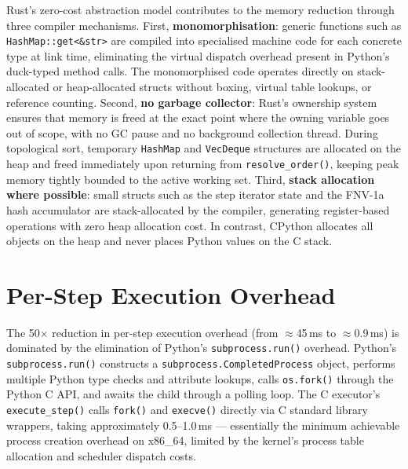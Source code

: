 \documentclass[12pt,a4paper]{report}
\begin{document}
Rust's zero-cost abstraction model contributes to the memory reduction through
three compiler mechanisms. First, \textbf{monomorphisation}: generic functions
such as \texttt{HashMap::get<\&str>} are compiled into specialised machine code
for each concrete type at link time, eliminating the virtual dispatch overhead
present in Python's duck-typed method calls. The monomorphised code operates
directly on stack-allocated or heap-allocated structs without boxing, virtual table
lookups, or reference counting. Second, \textbf{no garbage collector}: Rust's
ownership system ensures that memory is freed at the exact point where the owning
variable goes out of scope, with no GC pause and no background collection thread.
During topological sort, temporary \texttt{HashMap} and \texttt{VecDeque}
structures are allocated on the heap and freed immediately upon returning from
\texttt{resolve\_order()}, keeping peak memory tightly bounded to the active
working set. Third, \textbf{stack allocation where possible}: small structs such
as the step iterator state and the FNV-1a hash accumulator are stack-allocated by
the compiler, generating register-based operations with zero heap allocation cost.
In contrast, CPython allocates all objects on the heap and never places Python
values on the C stack.

\section{Per-Step Execution Overhead}

The 50$\times$ reduction in per-step execution overhead (from $\approx$45\,ms to
$\approx$0.9\,ms) is dominated by the elimination of Python's
\texttt{subprocess.run()} overhead. Python's \texttt{subprocess.run()} constructs
a \texttt{subprocess.CompletedProcess} object, performs multiple Python type
checks and attribute lookups, calls \texttt{os.fork()} through the Python C API,
and awaits the child through a polling loop. The C executor's
\texttt{execute\_step()} calls \texttt{fork()} and \texttt{execve()} directly via
C standard library wrappers, taking approximately 0.5--1.0\,ms --- essentially the
minimum achievable process creation overhead on x86\_64, limited by the kernel's
process table allocation and scheduler dispatch costs.
\end{document}
